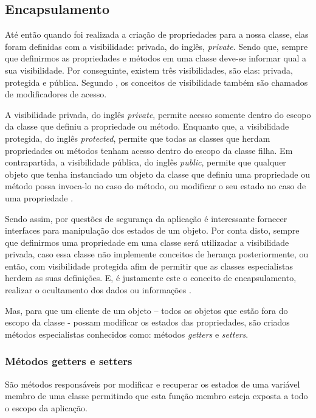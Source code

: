 \subsection{Encapsulamento}

Até então quando foi realizada a criação de propriedades para a nossa
classe, elas foram definidas com a visibilidade: privada, do inglês,
\textit{private}. Sendo que, sempre que definirmos as propriedades e métodos em 
uma classe deve-se informar qual a  sua visibilidade. Por conseguinte, existem 
três visibilidades, são elas: privada, protegida e pública. Segundo 
, os conceitos de visibilidade também são
chamados de modificadores de acesso.

A visibilidade privada, do inglês \textit{private}, permite acesso somente
dentro do escopo da classe que definiu a propriedade ou método. Enquanto que, a
visibilidade protegida, do inglês \textit{protected}, permite que todas as
classes  que herdam propriedades ou métodos tenham acesso dentro do escopo da classe filha.
Em contrapartida, a visibilidade pública, do inglês \textit{public}, permite que
qualquer objeto que tenha instanciado um objeto da classe que definiu uma propriedade ou
método possa invoca-lo no caso do método, ou modificar o seu estado no caso de
uma propriedade \cite{learningJava}.

Sendo assim, por questões de segurança da aplicação é interessante fornecer
interfaces para manipulação dos estados de um objeto. Por conta disto,  sempre
que definirmos uma propriedade em uma classe será utilizadar a visibilidade
privada, caso essa classe não implemente conceitos de herança posteriormente, 
ou então, com visibilidade protegida afim de permitir que as classes
especialistas  herdem as suas definições. E, é justamente este o conceito de 
encapsulamento, realizar o ocultamento dos dados ou informações \cite{javaComoProgramar}.

Mas, para que um cliente de um objeto – todos os objetos que estão fora do
escopo da classe -  possam modificar os estados das propriedades, são criados
métodos especialistas conhecidos como: métodos \textit{getters} e \textit{setters}.

\subsubsection{Métodos getters e setters}

São métodos responsáveis por modificar e recuperar os estados de uma variável
membro de uma classe permitindo que esta função membro esteja exposta a todo o
escopo da aplicação.

